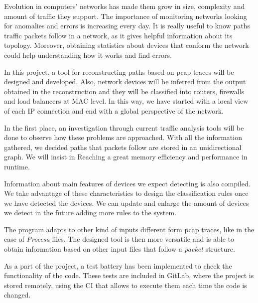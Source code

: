 Evolution in computers' networks has made them grow in size, complexity and amount of traffic they support. The importance of monitoring networks looking for anomalies and errors is increasing every day. It is really useful to know paths traffic packets follow in a network, as it gives helpful information about its topology. Moreover, obtaining statistics about devices that conform the network could help understanding how it works and find errors.

In this project, a tool for reconstructing paths based on pcap traces will be designed and developed. Also, network devices will be inferred from the output obtained in the reconstruction and they will be classified into routers, firewalls and load balancers at MAC level. In this way, we have started with a local view of each IP connection and end with a global perspective of the network.

In the first place, an investigation through current traffic analysis tools will be done to observe how these problems are approached. With all the information gathered, we decided paths that packets follow are stored in an unidirectional graph. We will insist in Reaching a great memory efficiency and performance in runtime.

Information about main features of devices we expect detecting is also compiled. We take advantage of these characteristics to design the classification rules once we have detected the devices. We can update and enlarge the amount of devices we detect in the future adding more rules to the system.

The program adapts to other kind of inputs different form pcap traces, like in the case of \textit{Procesa} files. The designed tool is then more versatile and is able to obtain information based on other input files that follow a \textit{packet} structure.

As a part of the project, a test battery has been implemented to check the functionality of the code. These tests are included in GitLab, where the project is stored remotely, using the CI that allows to execute them each time the code is changed.

